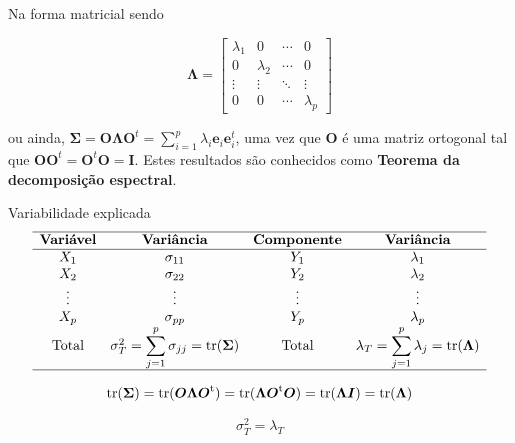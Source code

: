 \documentclass[
  ignorenonframetext,
  aspectratio=169,
]{beamer}
\begin{document}
\begin{frame}{Na forma matricial}
\label{na-forma-matricial-1}
sendo

\[\boldsymbol{\Lambda} = \left[ \begin{array}{cccc} \lambda_1 & 0 & \cdots & 0
\\ 0 & \lambda_2 & \cdots & 0
\\ \vdots & \vdots & \ddots & \vdots
\\ 0 & 0 & \cdots & \lambda_p \end{array} \right] \]

ou ainda,
\(\boldsymbol{\Sigma} = \boldsymbol{O} \boldsymbol{\Lambda} \boldsymbol{O}^t = \displaystyle \sum_{i=1}^p \lambda_i \boldsymbol{e}_i \boldsymbol{e}_i^t\),
uma vez que \(\boldsymbol{O}\) é uma matriz ortogonal tal que
\(\boldsymbol{O} \boldsymbol{O}^t = \boldsymbol{O}^t \boldsymbol{O} = \boldsymbol{I}\).
Estes resultados são conhecidos como \textbf{Teorema da decomposição
espectral}.
\end{frame}

\begin{frame}{Variabilidade explicada}
\label{variabilidade-explicada}
\[
\begin{array}{c @{\quad} c @{\quad} c @{\quad} c}
\hline
\textbf{Variável} & \textbf{Variância} & \textbf{Componente} & \textbf{Variância} \\
\hline
X_1 & \sigma_{11} & Y_1 & \lambda_1 \\
X_2 & \sigma_{22} & Y_2 & \lambda_2 \\
\vdots & \vdots & \vdots & \vdots \\
X_p & \sigma_{pp} & Y_p & \lambda_p \\
\text{Total} 
  & \sigma_T^2 = \displaystyle\sum_{j=1}^p \sigma_{jj} = \mathrm{tr}(\boldsymbol{\Sigma})
  & \text{Total}
  & \lambda_T = \displaystyle\sum_{j=1}^p \lambda_j = \mathrm{tr}(\boldsymbol{\Lambda}) \\
\hline
\end{array}
\]

\pause

\[\rm{tr}(\boldsymbol{\Sigma}) = \rm{tr}(\boldsymbol{O} \boldsymbol{\Lambda} \boldsymbol{O}^t) = \rm{tr}(\boldsymbol{\Lambda} \boldsymbol{O}^t \boldsymbol{O}) = \rm{tr}(\boldsymbol{\Lambda} \boldsymbol{I}) = \rm{tr}(\boldsymbol{\Lambda})\]

\pause

\[\sigma_T^2 = \lambda_T\]
\end{frame}
\end{document}
